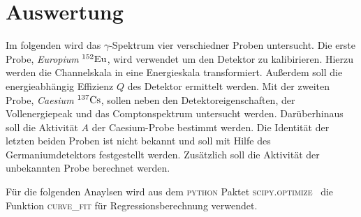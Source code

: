 \section{Auswertung}
Im folgenden wird das $\gamma$-Spektrum vier verschiedner Proben untersucht.
Die erste Probe, \emph{Europium} $^{152}\ce{Eu}$, wird verwendet um den Detektor
zu kalibirieren. Hierzu werden die Channelskala in eine Energieskala transformiert.
Außerdem soll die energieabhängig Effizienz $Q$ des Detektor ermittelt werden.
Mit der zweiten Probe, \emph{Caesium} $^{137}\ce{Cs}$, sollen neben den
Detektoreigenschaften, der Vollenergiepeak und das Comptonspektrum untersucht werden.
Darüberhinaus soll die Aktivität $A$ der Caesium-Probe bestimmt werden.
Die Identität der letzten beiden Proben ist nicht bekannt und soll mit Hilfe
des Germaniumdetektors festgestellt werden. Zusätzlich soll die Aktivität
der unbekannten Probe berechnet werden.

Für die folgenden Anaylsen wird aus dem \textsc{python} Paktet \textsc{scipy.optimize}~\cite{scipy}
die Funktion \textsc{curve\_{fit}} für Regressionsberechnung verwendet.

